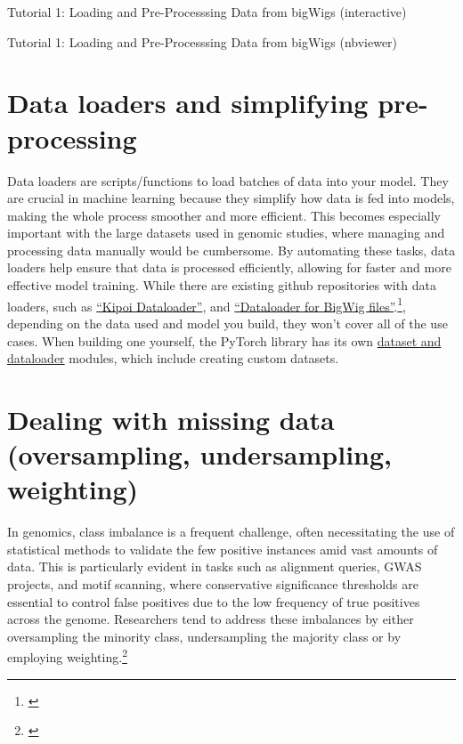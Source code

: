 \documentclass[
]{book}
\begin{document}
Tutorial 1: Loading and Pre-Processsing Data from bigWigs (interactive)

Tutorial 1: Loading and Pre-Processsing Data from bigWigs (nbviewer)

\section{Data loaders and simplifying pre-processing}\label{data-loaders-and-simplifying-pre-processing}

Data loaders are scripts/functions to load batches of data into your model. They are crucial in machine learning because they simplify how data is fed into models, making the whole process smoother and more efficient. This becomes especially important with the large datasets used in genomic studies, where managing and processing data manually would be cumbersome. By automating these tasks, data loaders help ensure that data is processed efficiently, allowing for faster and more effective model training. While there are existing github repositories with data loaders, such as \href{https://kipoi.org/kipoiseq/dataloaders/}{``Kipoi Dataloader''}, and \href{https://github.com/pfizer-opensource/bigwig-loader/blob/main/README.md}{``Dataloader for BigWig files''}.\footnote{\citet{retel_fast_2024}}, depending on the data used and model you build, they won't cover all of the use cases. When building one yourself, the PyTorch library has its own \href{https://pytorch.org/tutorials/beginner/basics/data_tutorial.html}{dataset and dataloader} modules, which include creating custom datasets.

\section{Dealing with missing data (oversampling, undersampling, weighting)}\label{dealing-with-missing-data-oversampling-undersampling-weighting}

In genomics, class imbalance is a frequent challenge, often necessitating the use of statistical methods to validate the few positive instances amid vast amounts of data. This is particularly evident in tasks such as alignment queries, GWAS projects, and motif scanning, where conservative significance thresholds are essential to control false positives due to the low frequency of true positives across the genome. Researchers tend to address these imbalances by either oversampling the minority class, undersampling the majority class or by employing weighting.\footnote{\citet{whalen2022}}
\end{document}
